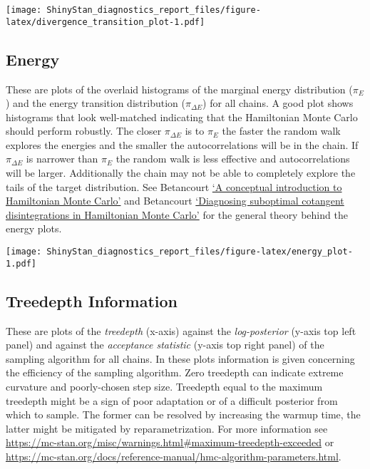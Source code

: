 \documentclass[11pt,]{article}
\begin{document}
\texttt{[image: ShinyStan\_diagnostics\_report\_files/figure-latex/divergence\_transition\_plot-1.pdf]}

\newpage

\hypertarget{energy}{%
\subsection{Energy}\label{energy}}

These are plots of the overlaid histograms of the marginal energy
distribution (\(\pi_E\)) and the energy transition distribution
(\(\pi_{\Delta E}\)) for all chains. A good plot shows histograms that
look well-matched indicating that the Hamiltonian Monte Carlo should
perform robustly. The closer \(\pi_{\Delta E}\) is to \(\pi_E\) the
faster the random walk explores the energies and the smaller the
autocorrelations will be in the chain. If \(\pi_{\Delta E}\) is narrower
than \(\pi_E\) the random walk is less effective and autocorrelations
will be larger. Additionally the chain may not be able to completely
explore the tails of the target distribution. See Betancourt
\href{https://arxiv.org/abs/1701.02434}{`A conceptual introduction to
Hamiltonian Monte Carlo'} and Betancourt
\href{https://arxiv.org/abs/1604.00695}{`Diagnosing suboptimal cotangent
disintegrations in Hamiltonian Monte Carlo'} for the general theory
behind the energy plots.

\texttt{[image: ShinyStan\_diagnostics\_report\_files/figure-latex/energy\_plot-1.pdf]}

\newpage

\hypertarget{treedepth-information}{%
\subsection{Treedepth Information}\label{treedepth-information}}

These are plots of the \emph{treedepth} (x-axis) against the
\emph{log-posterior} (y-axis top left panel) and against the
\emph{acceptance statistic} (y-axis top right panel) of the sampling
algorithm for all chains. In these plots information is given concerning
the efficiency of the sampling algorithm. Zero treedepth can indicate
extreme curvature and poorly-chosen step size. Treedepth equal to the
maximum treedepth might be a sign of poor adaptation or of a difficult
posterior from which to sample. The former can be resolved by increasing
the warmup time, the latter might be mitigated by reparametrization. For
more information see
\url{https://mc-stan.org/misc/warnings.html\#maximum-treedepth-exceeded}
or
\href{https://mc-stan.org/docs/2_19/reference-manual/hmc-algorithm-parameters.html}{https://mc-stan.org/docs/reference-manual/hmc-algorithm-parameters.html}.
\end{document}
